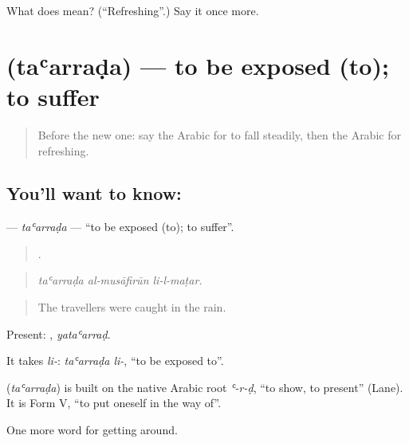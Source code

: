 \begin{tcolorbox}[breakable,colback=teal!4,colframe=teal!35!black,title={Before you move on}]
What does  mean? (\textquotedblleft{}Refreshing\textquotedblright{}.) Say it once more.
\end{tcolorbox}
\section[\texorpdfstring{\ar{تعرض} (taʿarraḍa)}{تعرض (taʿarraḍa)}]{ (taʿarraḍa) — to be exposed (to); to suffer}

\label{lesson:AR-C486-taarrada}



\begin{quote}
Before the new one: say the Arabic for to fall steadily, then the Arabic for refreshing.
\end{quote}

\subsection*{You'll want to know: }
\textbf{} — \emph{taʿarraḍa} — \textquotedblleft{}to be exposed (to); to suffer\textquotedblright{}.

\begin{quote}
  .
\end{quote}

\begin{quote}
\emph{taʿarraḍa al-musāfirūn li-l-maṭar.}
\end{quote}

\begin{quote}
The travellers were caught in the rain.
\end{quote}

Present: , \emph{yataʿarraḍ}.

It takes \emph{li-}: \emph{taʿarraḍa li-}, \textquotedblleft{}to be exposed to\textquotedblright{}.

\begin{cousinweb}
\textbf{} (\emph{taʿarraḍa}) is built on the native Arabic root \emph{ʿ-r-ḍ}, \textquotedblleft{}to show, to present\textquotedblright{} (Lane). It is Form V, \textquotedblleft{}to put oneself in the way of\textquotedblright{}.
\end{cousinweb}

\begin{grammarlens}[title={What you've built}]
One more word for getting around.
\end{grammarlens}

